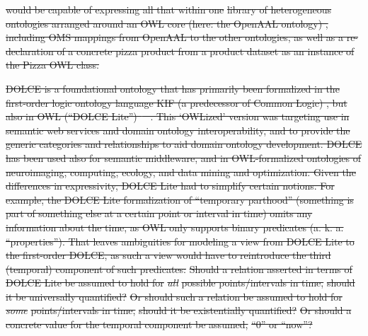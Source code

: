 \documentclass[10pt,fleqn,final]{scrreprt}
\makeatletter
\newcommand*{\eg}{e.g.\@\xspace}
\newcommand*{\ie}{i.e.\@\xspace}
\newcommand*{\DOL}{\ensuremath{\mathsf{DOL}}\xspace}
\providecommand{\DIFdel}[1]{{\protect\color{red}\sout{#1}}}                      %
\makeatother
\begin{document}
\DIFdel{would be capable of expressing all that within one }%
\DIFdel{library of heterogeneous ontologies arranged around an OWL core (here:     the OpenAAL ontology) , including OMS mappings from OpenAAL to the other ontologies, as well as a re-declaration of a concrete pizza product from a product dataset as an instance of the Pizza OWL class.
}%

\DIFdel{DOLCE is a foundational ontology that has primarily been formalized in the first-order logic ontology language KIF (a predecessor of Common Logic) , but also in OWL (``DOLCE Lite'')\mbox{%
\cite{dolce}
}%
. This ‘OWLized’ version was targeting use in semantic web services and domain ontology interoperability, and to provide the generic categories and relationships to aid domain ontology development. DOLCE has been used also for semantic middleware, and in OWL-formalized ontologies of neuroimaging, computing, ecology, and data mining and optimization. Given the differences in expressivity, DOLCE Lite had to simplify certain notions. For example, the DOLCE Lite formalization of ``temporary parthood'' (something is part of something else at a certain point or interval in time) omits any information about the time, as OWL only supports binary predicates (a. k. a. }%
\DIFdel{``properties'').  That leaves ambiguities for modeling a view from DOLCE Lite to the first-order DOLCE, as such a view would have to reintroduce the third (temporal) component of such predicates:}%
\DIFdel{Should a relation asserted in terms of DOLCE Lite be assumed to hold for }\emph{\DIFdel{all}} %
\DIFdel{possible points/intervals in time, }%
\DIFdel{should it be universally quantified?
  }%
\DIFdel{Or should such a relation be assumed to hold for }\emph{\DIFdel{some}} %
\DIFdel{points/intervals in time, }%
\DIFdel{should it be existentially quantified?
  }%
\DIFdel{Or should a concrete value for the temporal component be assumed, }%
\DIFdel{``0'' or ``now''?
  }%
\end{document}
